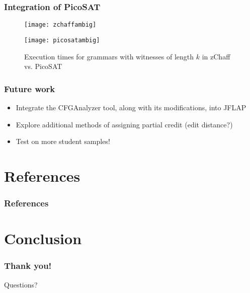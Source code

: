 \documentclass{beamer}
\begin{document}
\begin{frame}
\frametitle{Integration of PicoSAT}
\begin{figure}[H]
	\centering
	\begin{minipage}{0.49\textwidth}
		\centering
		\texttt{[image: zchaffambig]}
	\end{minipage}
	\begin{minipage}{0.49\textwidth}
		\centering
		\texttt{[image: picosatambig]}
	\end{minipage}
	\caption*{Execution times for grammars with witnesses of length $k$ in zChaff  vs. PicoSAT }
\end{figure}

\end{frame}

\begin{frame}
\frametitle{Future work}
\begin{itemize}
\item Integrate the CFGAnalyzer tool, along with its modifications, into JFLAP
\vspace{0.1in}
\item Explore additional methods of assigning partial credit (edit distance?)
\vspace{0.1in}
\item Test on more student samples!
\end{itemize}
\end{frame}

\section{References}
\begin{frame}[t,allowframebreaks] 
	\nocite{*}
	\frametitle{References}
	\printbibliography
\end{frame}

\section{Conclusion}
\begin{frame}
\frametitle{Thank you!}
\begin{center} \LARGE Questions?
\end{center}
\end{frame}
\end{document}
